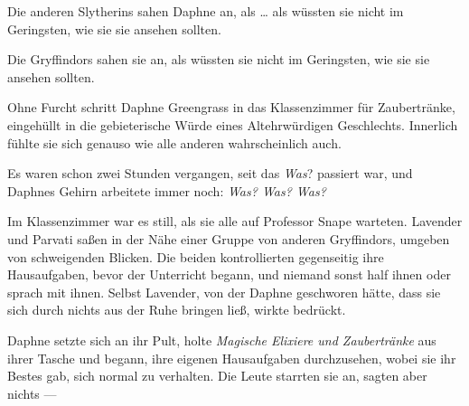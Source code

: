 
Die anderen Slytherins sahen Daphne an, als … als wüssten sie nicht im Geringsten, wie sie sie ansehen sollten.

Die Gryffindors sahen sie an, als wüssten sie nicht im Geringsten, wie sie sie ansehen sollten.

Ohne Furcht schritt Daphne Greengrass in das Klassenzimmer für Zaubertränke, eingehüllt in die gebieterische Würde eines Altehrwürdigen Geschlechts. Innerlich fühlte sie sich genauso wie alle anderen wahrscheinlich auch.

Es waren schon zwei Stunden vergangen, seit das \emph{Was}? passiert war, und Daphnes Gehirn arbeitete immer noch: \emph{Was? Was? Was?}

Im Klassenzimmer war es still, als sie alle auf Professor Snape warteten. Lavender und Parvati saßen in der Nähe einer Gruppe von anderen Gryffindors, umgeben von schweigenden Blicken. Die beiden kontrollierten gegenseitig ihre Hausaufgaben, bevor der Unterricht begann, und niemand sonst half ihnen oder sprach mit ihnen. Selbst Lavender, von der Daphne geschworen hätte, dass sie sich durch nichts aus der Ruhe bringen ließ, wirkte bedrückt.

Daphne setzte sich an ihr Pult, holte \emph{Magische Elixiere und Zaubertränke} aus ihrer Tasche und begann, ihre eigenen Hausaufgaben durchzusehen, wobei sie ihr Bestes gab, sich normal zu verhalten. Die Leute starrten sie an, sagten aber nichts —

